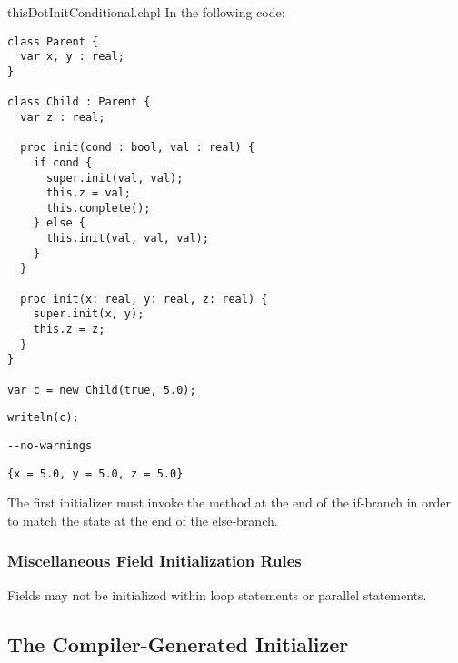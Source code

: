 \begin{chapelexample}{thisDotInitConditional.chpl}
In the following code:
\begin{chapel}
\begin{verbatim}
class Parent {
  var x, y : real;
}

class Child : Parent {
  var z : real;

  proc init(cond : bool, val : real) {
    if cond {
      super.init(val, val);
      this.z = val;
      this.complete();
    } else {
      this.init(val, val, val);
    }
  }

  proc init(x: real, y: real, z: real) {
    super.init(x, y);
    this.z = z;
  }
}

var c = new Child(true, 5.0);
\end{verbatim}
\end{chapel}
\begin{chapelpost}
\begin{verbatim}
writeln(c);
\end{verbatim}
\end{chapelpost}
\begin{chapelcompopts}
\begin{verbatim}
--no-warnings
\end{verbatim}
\end{chapelcompopts}
\begin{chapeloutput}
\begin{verbatim}
{x = 5.0, y = 5.0, z = 5.0}
\end{verbatim}
\end{chapeloutput}
The first initializer must invoke the  method at the end of
the if-branch in order to match the state at the end of the else-branch.
\end{chapelexample}

\subsubsection{Miscellaneous Field Initialization Rules}

Fields may not be initialized within loop statements or parallel statements.

\subsection{The Compiler-Generated Initializer}
\label{The_Compiler_Generated_Initializer}

